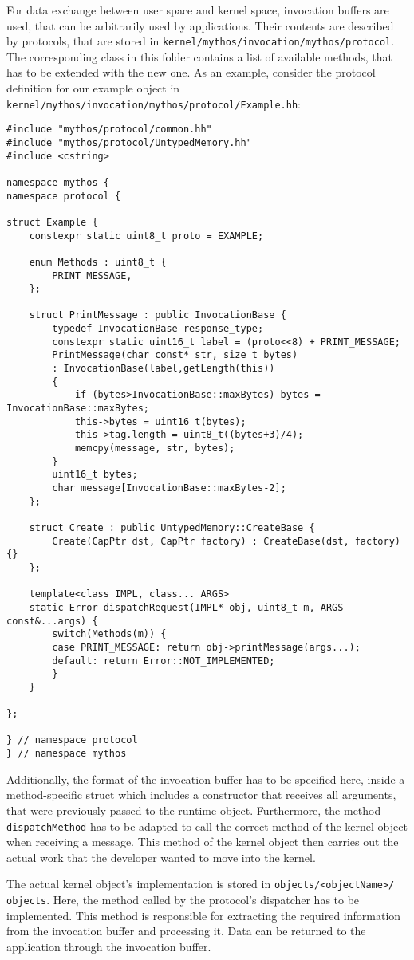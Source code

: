 For data exchange between user space and kernel space, invocation buffers are
used, that can be arbitrarily used by applications. Their contents are
described by protocols, that are stored in
\texttt{kernel/mythos/invocation/mythos/protocol}. The corresponding class in
this folder contains a list of available methods, that has to be extended with
the new one. As an example, consider the protocol definition for our example object in
\texttt{kernel/mythos/invocation/mythos/protocol/Example.hh}: 

\lstset{language=c++,caption=Object's Protocol Definition,label=lst:obj-protocol}
\begin{lstlisting}
#include "mythos/protocol/common.hh"
#include "mythos/protocol/UntypedMemory.hh"
#include <cstring>

namespace mythos {
namespace protocol {

struct Example {
	constexpr static uint8_t proto = EXAMPLE;

	enum Methods : uint8_t {
		PRINT_MESSAGE,
	};

	struct PrintMessage : public InvocationBase {
		typedef InvocationBase response_type;
		constexpr static uint16_t label = (proto<<8) + PRINT_MESSAGE;
		PrintMessage(char const* str, size_t bytes)
		: InvocationBase(label,getLength(this))
		{
			if (bytes>InvocationBase::maxBytes) bytes = InvocationBase::maxBytes;
			this->bytes = uint16_t(bytes);
			this->tag.length = uint8_t((bytes+3)/4);
			memcpy(message, str, bytes);
		}
		uint16_t bytes;
		char message[InvocationBase::maxBytes-2];
	};

	struct Create : public UntypedMemory::CreateBase {
		Create(CapPtr dst, CapPtr factory) : CreateBase(dst, factory) {}
	};

	template<class IMPL, class... ARGS>
	static Error dispatchRequest(IMPL* obj, uint8_t m, ARGS const&...args) {
		switch(Methods(m)) {
		case PRINT_MESSAGE: return obj->printMessage(args...);
		default: return Error::NOT_IMPLEMENTED;
		}
	}

};

} // namespace protocol
} // namespace mythos
\end{lstlisting}


Additionally, the format of the invocation buffer has to be specified here,
inside a method-specific struct which includes a constructor that receives all
arguments, that were previously passed to the runtime object.  Furthermore, the
method \texttt{dispatchMethod} has to be adapted to call the correct method of
the kernel object when receiving a message. This method of the kernel object
then carries out the actual work that the developer wanted to move into the
kernel.

The actual kernel object's implementation is stored in
\texttt{objects/<objectName>/\\objects}. Here, the method called by the
protocol's dispatcher has to be implemented. This method is responsible for
extracting the required information from the invocation buffer and processing
it. Data can be returned to the application through the invocation buffer.

% 
% 


